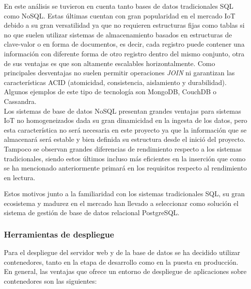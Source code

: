 \documentclass[../proyecto.tex]{subfiles}
\begin{document}
En este análisis se tuvieron en cuenta tanto bases de datos tradicionales SQL como NoSQL. Estas últimas cuentan con gran popularidad en el mercado IoT debido a su gran versatilidad ya que no requieren estructuras fijas como tablas si no que suelen utilizar sistemas de almacenamiento basados en estructuras de clave-valor o en forma de documentos, es decir, cada registro puede contener una información con diferente forma de otro registro dentro del mismo conjunto, otra de sus ventajas es que son altamente escalables horizontalmente. Como principales desventajas no suelen permitir operaciones \textit{JOIN} ni garantizan las características ACID (atomicidad, consistencia, aislamiento y durabilidad). Algunos ejemplos de este tipo de tecnología son MongoDB, CouchDB o Cassandra.\\

Los sistemas de base de datos NoSQL presentan grandes ventajas para sistemas IoT no homogeneizados dada su gran dinamicidad en la ingesta de los datos, pero esta característica no será necesaria en este proyecto ya que la información que se almacenará será estable y bien definida su estructura desde el inició del proyecto. Tampoco se observan grandes diferencias de rendimiento respecto a los sistemas tradicionales, siendo estos últimos incluso más eficientes en la inserción \cite{ASIMINIDIS2018} \cite{RAUTMARE2016} que como se ha mencionado anteriormente primará en los requisitos respecto al rendimiento en lectura.

Estos motivos junto a la familiaridad con los sistemas tradicionales SQL, su gran ecosistema y madurez en el mercado han llevado a seleccionar como solución el sistema de gestión de base de datos relacional PostgreSQL.

\subsubsection{Herramientas de despliegue}

Para el despliegue del servidor web y de la base de datos se ha decidido utilizar contenedores, tanto en la etapa de desarrollo como en la puesta en producción. En general, las ventajas que ofrece un entorno de despliegue de aplicaciones sobre contenedores son las siguientes:\\
\end{document}

